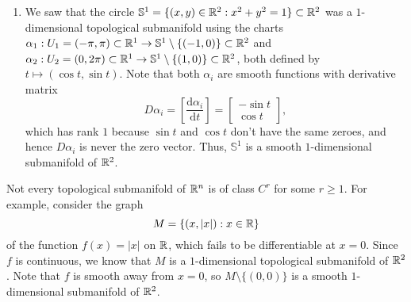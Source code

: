 \begin{enumerate}[(1)]
    \item We saw that the circle $\mathbb{S}^1 = \{(x, y) \in \mathbb{R}^2 : x^2 + y^2 = 1\} 
    \subset \mathbb{R}^2$ was a $1$-dimensional topological submanifold using
    the charts $\alpha_1 : U_1 = (-\pi, \pi) \subset \mathbb{R}^1 \to 
    \mathbb{S}^1 \setminus \{(-1, 0)\} \subset \mathbb{R}^2$ and 
    $\alpha_2 : U_2 = (0, 2\pi) \subset \mathbb{R}^1 \to \mathbb{S}^1 \setminus 
    \{(1, 0)\} \subset \mathbb{R}^2$, both defined by $t \mapsto (\cos t, \sin t)$. 
    Note that both $\alpha_i$ are smooth functions with derivative matrix 
    \[ D\alpha_i = \left[ \frac{\textrm{d}\alpha_i}{\textrm{d}t} \right] = 
    \begin{bmatrix} -\sin t \\ \cos t \end{bmatrix}, \] 
    which has rank $1$ because $\sin t$ and $\cos t$ don't have the same zeroes, 
    and hence $D\alpha_i$ is never the zero vector. Thus, $\mathbb{S}^1$ 
    is a smooth $1$-dimensional submanifold of $\mathbb{R}^2$. 
\end{enumerate}
Not every topological submanifold of $\mathbb{R}^n$ is of class $C^r$ 
for some $r \geq 1$. For example, consider the graph 
\[ M = \{(x, |x|) : x \in \mathbb{R}\} \] 
of the function $f(x) = |x|$ on $\mathbb{R}$, which fails to be differentiable 
at $x = 0$. Since $f$ is continuous, we know that 
$M$ is a $1$-dimensional topological submanifold of $\mathbb{R}^2$. Note that $f$ is 
smooth away from $x = 0$, so $M \setminus \{(0, 0)\}$ is a smooth $1$-dimensional
submanifold of $\mathbb{R}^2$. 

